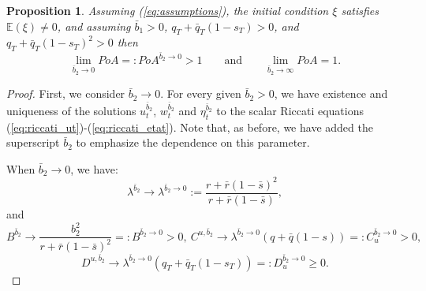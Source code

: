 \documentclass[11pt]{article}
\newtheorem{proposition}{Proposition}
\begin{document}
\begin{proposition}
	Assuming (\ref{eq:assumptions}), the initial condition $\xi$ satisfies $\mathbb{E}(\xi)\neq 0$, and assuming $\bar{b}_1> 0$, $q_T+\bar{q}_T(1-s_T)>0$, and $q_T+\bar{q}_T(1-s_T)^2>0$ then 
	\begin{equation*}
	\lim_{\bar{b}_2 \to 0} PoA =: PoA^{\bar{b}_2\to 0} > 1\qquad \text{and} \qquad\lim_{\bar{b}_2 \to \infty} PoA = 1.
	\end{equation*}
	\label{prop:b2bar}
\end{proposition}
\begin{proof}
	First, we consider $\bar{b}_2 \to 0$. For every given $\bar{b}_2 >0$, we have existence and uniqueness of the solutions $u^{\bar{b}_2}_t$, $w^{\bar{b}_2}_t$ and $\eta^{\bar{b}_2}_t$ to the scalar Riccati equations (\ref{eq:riccati_ut})-(\ref{eq:riccati_etat}). Note that, as before, we have added the superscript $\bar{b}_2$ to emphasize the dependence on this parameter.
	
	When $\bar{b}_2 \to 0$, we have:
	$$\displaystyle \lambda^{\bar{b}_2} \to \lambda^{\bar{b}_2 \to 0} := \frac{r + \bar{r}(1- \bar{s})^2}{r + \bar{r}(1-\bar{s})},$$
	and 
	$$B^{\bar{b}_2} \to \frac{b_2^2}{r + \bar{r}(1-\bar{s})^2}=:B^{\bar{b}_2 \to 0} > 0,\ C^{u,\bar{b}_2} \to \lambda^{\bar{b}_2 \to 0}(q+\bar{q}(1-s))=:C^{\bar{b}_2 \to 0}_u >0,$$
	$$D^{u,\bar{b}_2} \to \lambda^{\bar{b}_2 \to 0}(q_T+\bar{q}_T(1-s_T))=:D^{\bar{b}_2 \to 0}_u \geq 0.$$
	

\end{proof}
\end{document}
